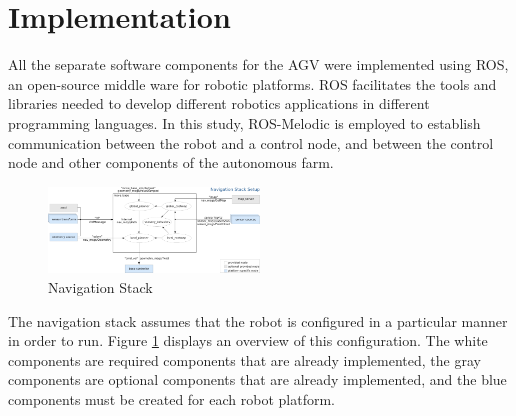 \section{Implementation}\label{implementation}




All the separate software components for the AGV were implemented using ROS, an open-source middle ware for robotic platforms. ROS facilitates the tools and libraries needed to develop different robotics applications in different programming languages. In this study, ROS-Melodic is employed to establish communication between the robot and a control node, and between the control node and other components of the autonomous farm.

\begin{figure}[H]
    \centering
    \includegraphics[width=0.5\textwidth,height=0.6\textheight,keepaspectratio]{images/Navigation.png}
    \caption{Navigation Stack}
    \label{fig:app:navigation}
\end{figure}

The navigation stack assumes that the robot is configured in a particular manner in order to run. Figure \ref{fig:app:navigation} displays an overview of this configuration. The white components are required components that are already implemented, the gray components are optional components that are already implemented, and the blue components must be created for each robot platform. 


